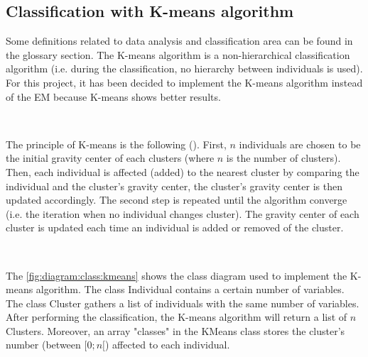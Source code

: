 





\subsection{Classification with K-means algorithm}

Some definitions related to \gls{data analysis} and \gls{classification} area can be found in the glossary section. The K-means \gls{algorithm} is a non-hierarchical \gls{classification} \gls{algorithm} (i.e. during the \gls{classification}, no hierarchy between \glspl{individual} is used). For this project, it has been decided to implement the K-means \gls{algorithm} instead of the \gls{EM} because K-means shows better results. 

~~ 

The principle of K-means is the following (\cite{bib:clustering:AnalyseDesDonnees}). First, $n$ \glspl{individual} are chosen to be the initial gravity center of each \glspl{cluster} (where $n$ is the number of clusters). Then, each individual is affected (added) to the nearest \gls{cluster} by comparing the \gls{individual} and the \gls{cluster}'s gravity center, the \gls{cluster}'s gravity center is then  updated accordingly. The second step is repeated until the \gls{algorithm} converge (i.e. the iteration when no \gls{individual} changes \gls{cluster}). The gravity center of each \gls{cluster} is updated each time an \gls{individual} is added or removed of the \gls{cluster}.

~~

The \vref{fig:diagram:class:kmeans} shows the class diagram used to implement the K-means \gls{algorithm}. The class Individual contains a certain number of variables. The class Cluster gathers a list of individuals with the same number of variables. After performing the classification, the K-means \gls{algorithm} will return a list of $n$ Clusters. Moreover, an array "classes" in the KMeans class stores the \gls{cluster}'s number (between $[0;n[$) affected to each \gls{individual}.

